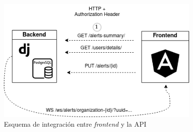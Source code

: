 \begin{figure}[H]
	\centering
	\includegraphics[width=0.9\textwidth]{./Figures/integracion-3.png}
	\caption{Esquema de integración entre \textit{frontend} y la API}
	\label{integracion:3}
\end{figure}

